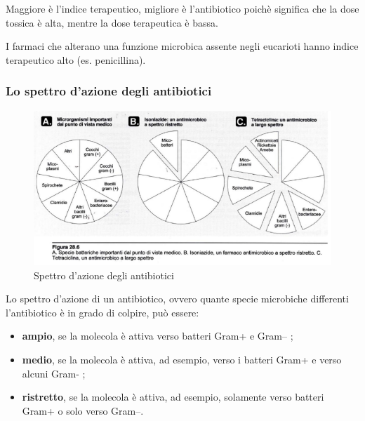 \documentclass[11pt]{book}
\begin{document}
Maggiore è l’indice terapeutico, migliore è l’antibiotico poichè significa che la dose tossica è alta, mentre la dose terapeutica è bassa.

I farmaci che alterano una funzione microbica assente negli eucarioti hanno indice terapeutico alto (es. penicillina).

\clearpage
\subsubsection{Lo spettro d’azione degli antibiotici}

\begin{figure}[htp]
\centering
\includegraphics[scale=0.5]{img/Spettro d'azione.png}
\caption{Spettro d'azione degli antibiotici}
\label{}
\end{figure}

Lo spettro d'azione di un antibiotico, ovvero quante specie microbiche differenti l'antibiotico è in grado di colpire, può essere:
\begin{itemize}
\item \textbf{ampio}, se la molecola è attiva verso batteri Gram+ e Gram– ;
\item \textbf{medio}, se la molecola è attiva, ad esempio, verso i batteri Gram+ e verso alcuni Gram- ;
\item \textbf{ristretto}, se la molecola è attiva, ad esempio, solamente verso batteri Gram+ o solo verso Gram–.
\end{itemize}
\end{document}
